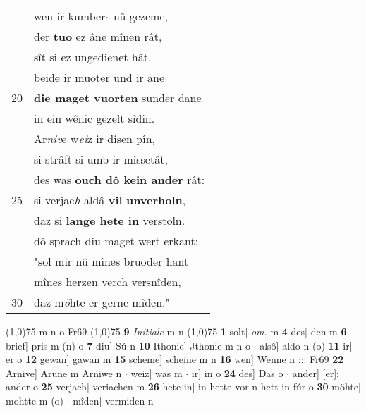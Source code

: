 \documentclass[8pt,a4paper,notitlepage]{article}
\begin{document}
\begin{table}[ht]
\begin{minipage}[t]{0.5\linewidth}
\begin{tabular}{rl}
 & wen ir kumbers nû gezeme,\\ 
 & der \textbf{tuo} ez âne mînen rât,\\ 
 & sît si ez ungedienet hât.\\ 
 & beide ir muoter und ir ane\\ 
20 & \textbf{die maget vuorten} sunder dane\\ 
 & in ein wênic gezelt sîdîn.\\ 
 & Ar\textit{niv}e w\textit{ei}z ir disen pîn,\\ 
 & si strâft si umb ir missetât,\\ 
 & des was \textbf{ouch dô kein ander} rât:\\ 
25 & si verjac\textit{h} aldâ \textbf{vil} \textbf{unverholn},\\ 
 & daz si \textbf{lange hete in} verstoln.\\ 
 & dô sprach diu maget wert erkant:\\ 
 & "sol mir nû mînes bruoder hant\\ 
 & mînes herzen verch versnîden,\\ 
30 & daz m\textit{ö}hte er gerne mîden."\\ 
\end{tabular}
\scriptsize
\line(1,0){75} \newline
m n o Fr69 \newline
\line(1,0){75} \newline
\textbf{9} \textit{Initiale} m n  \newline
\line(1,0){75} \newline
\textbf{1} solt] \textit{om.} m \textbf{4} des] den m \textbf{6} brief] pris m (n) o \textbf{7} diu] Sú n \textbf{10} Ithonie] Jthonie m n o  $\cdot$ alsô] aldo n (o) \textbf{11} ir] er o \textbf{12} gewan] gawan m \textbf{15} scheme] scheine m n \textbf{16} wen] Wenne n ::: Fr69 \textbf{22} Arnive] Arune m Arniwe n  $\cdot$ weiz] was m  $\cdot$ ir] in o \textbf{24} des] Das o  $\cdot$ ander] [er]: ander o \textbf{25} verjach] veriachen m \textbf{26} hete in] in hette vor n hett in fúr o \textbf{30} möhte] mohtte m (o)  $\cdot$ mîden] vermiden n \newline
\end{minipage}
\end{table}
\newpage
\end{document}
